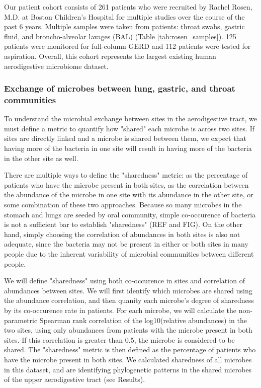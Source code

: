 \documentclass[12pt]{article}
\begin{document}
Our patient cohort consists of 261 patients who were recruited by Rachel Rosen, M.D. at Boston Children's Hospital for multiple studies over the course of the past 6 years. Multiple samples were taken from patients: throat swabs, gastric fluid, and broncho-alveolar lavages (BAL) (Table \ref{tab:rosen_samples}). 125 patients were monitored for full-column GERD and 112 patients were tested for aspiration. Overall, this cohort represents the largest existing human aerodigestive microbiome dataset.

\subsubsection{Exchange of microbes between lung, gastric, and throat communities}
To understand the microbial exchange between sites in the aerodigestive tract, we must define a metric to quantify how "shared" each microbe is across two sites. If sites are directly linked and a microbe is shared between them, we expect that having more of the bacteria in one site will result in having more of the bacteria in the other site as well. 

There are multiple ways to define the "sharedness" metric: as the percentage of patients who have the microbe present in both sites, as the correlation between the abundance of the microbe in one site with its abundance in the other site, or some combination of these two approaches. Because so many microbes in the stomach and lungs are seeded by oral community, simple co-occurence of bacteria is not a sufficient bar to establish "sharedness" (REF and FIG). On the other hand, simply choosing the correlation of abundances in both sites is also not adequate, since the bacteria may not be present in either or both sites in many people due to the inherent variability of microbial communities between different people. 

We will define "sharedness" using both co-occurence in sites and correlation of abundances between sites. We will first identify which microbes are shared using the abundance correlation, and then quanity each microbe's degree of sharedness by its co-occurence rate in patients. For each microbe, we will calculate the non-parametric Spearman rank correlation of the log10(relative abundances) in the two sites, using only abundances from patients with the microbe present in both sites. If this correlation is greater than 0.5, the microbe is considered to be shared. The "sharedness" metric is then defined as the percentage of patients who have the microbe present in both sites. We calculated sharedness of all microbes in this dataset, and are identifying phylogenetic patterns in the shared microbes of the upper aerodigestive tract (see Results).
\end{document}
